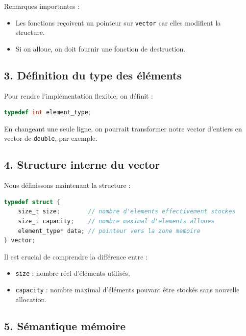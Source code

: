 Remarques importantes :

\begin{itemize}
    \item Les fonctions reçoivent un pointeur sur \texttt{vector}
    car elles modifient la structure.
    \item Si on alloue, on doit fournir une fonction de destruction.
\end{itemize}

\subsection*{3. Définition du type des éléments}

Pour rendre l’implémentation flexible, on définit :

\begin{lstlisting}[language=C]
typedef int element_type;
\end{lstlisting}

En changeant une seule ligne, on pourrait transformer notre
vector d’entiers en vector de \texttt{double}, par exemple.

\subsection*{4. Structure interne du vector}

Nous définissons maintenant la structure :

\begin{lstlisting}[language=C]
typedef struct {
    size_t size;        // nombre d'elements effectivement stockes
    size_t capacity;    // nombre maximal d'elements alloues
    element_type* data; // pointeur vers la zone memoire
} vector;
\end{lstlisting}

Il est crucial de comprendre la différence entre :

\begin{itemize}
    \item \texttt{size} : nombre réel d’éléments utilisés,
    \item \texttt{capacity} : nombre maximal d’éléments pouvant être stockés
    sans nouvelle allocation.
\end{itemize}

\subsection*{5. Sémantique mémoire}

